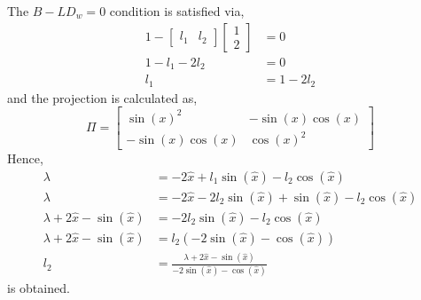 The $B-LD_w=0$ condition is satisfied via,
    \begin{equation*}
    \begin{split}
        1-\begin{bmatrix}l_1& l_2
        \end{bmatrix}\begin{bmatrix}1\\2
        \end{bmatrix}&=0\\
        1-l_1-2l_2&=0\\
        l_1&=1-2l_2
    \end{split}
    \end{equation*}
and the projection is calculated as,
    \begin{equation*}
        \Pi=\begin{bmatrix}
            \sin(x)^2& -\sin(x)\cos(x)\\
            -\sin(x)\cos(x)& \cos(x)^2
        \end{bmatrix}
\end{equation*}
Hence,
\begin{equation*}
    \begin{split}
        \lambda&=-2\hat{x}+l_1\sin(\hat{x})-l_2\cos(\hat{x})\\
        \lambda&=-2\hat{x}-2l_2\sin(\hat{x})+\sin(\hat{x})-l_2\cos(\hat{x})\\
        \lambda+2\hat{x}-\sin(\hat{x})&=-2l_2\sin(\hat{x})-l_2\cos(\hat{x})\\
        \lambda+2\hat{x}-\sin(\hat{x})&=l_2(-2\sin(\hat{x})-\cos(\hat{x}))\\
        l_2&=\frac{\lambda+2\hat{x}-\sin(\hat{x})}{-2\sin(\hat{x})-\cos(\hat{x})}
    \end{split}
\end{equation*}
is obtained.